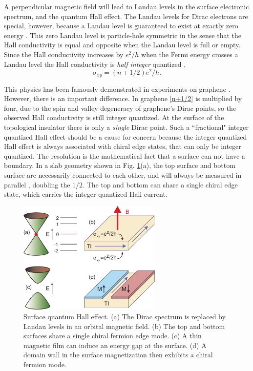 \documentclass[twocolumn,floatfix,showpacs,rmp,aps]{revtex4}
\begin{document}
A perpendicular magnetic field will lead to Landau levels in the
surface electronic spectrum, and the quantum Hall effect.
The Landau levels for Dirac electrons
are special, however, because a Landau level is guaranteed to exist
at exactly zero energy \cite{jackiw84}.  This zero Landau level is particle-hole symmetric
in the sense that the Hall conductivity is equal and opposite when the
Landau level is full or empty.  Since the Hall conductivity increases by
$e^2/h$ when the Fermi energy crosses a Landau level
the Hall conductivity is {\it half integer} quantized \cite{ando02},
\begin{equation}
\sigma_{xy} = (n+1/2) e^2/h.
\label{n+1/2}
\end{equation}

This physics has been famously demonstrated in experiments on
graphene \cite{novoselov05,zhangy05}.  However, there is an important difference.  In graphene
\eqref{n+1/2} is multiplied by four, due to the spin and valley degeneracy
of graphene's Dirac points, so the observed Hall conductivity is
still integer quantized.  At the surface of the topological
insulator there is only a {\it single} Dirac point.  Such a
``fractional" integer quantized Hall effect should be a cause for
concern because the integer quantized Hall effect is always
associated with chiral edge states, that can only be integer
quantized.  The resolution is the mathematical fact
that a surface can not have
a boundary.  In a slab geometry shown in Fig. \ref{fig:surfaceqhe}(a), the
top surface and bottom surface are necessarily connected to each other, and will
always be measured in parallel \cite{fukane07}, doubling the $1/2$.  The top and
bottom can share a single chiral edge state, which carries the integer
quantized Hall current.

\begin{figure}
\includegraphics[width=2.8in]{Fig18}
\caption{Surface quantum Hall effect.  (a) The Dirac spectrum is replaced by Landau levels
in an orbital magnetic field.  (b) The top and bottom surfaces share a single chiral fermion
edge mode.  (c) A thin magnetic film can induce an energy gap at the surface.
(d) A domain wall in the surface magnetization then exhibits a chiral fermion mode.}
\label{fig:surfaceqhe}
\end{figure}
\end{document}
